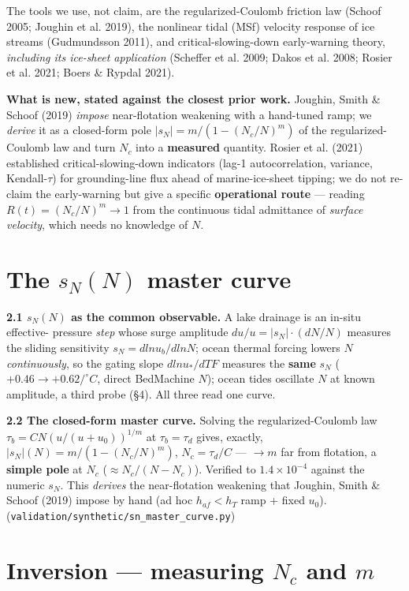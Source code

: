 \documentclass[tc, manuscript]{copernicus}
\begin{document}
The tools we use, not claim, are the regularized-Coulomb friction law (Schoof 2005; Joughin et al. 2019), the nonlinear tidal (MSf) velocity response of ice streams (Gudmundsson 2011), and critical-slowing-down early-warning theory, \emph{including its ice-sheet application} (Scheffer et al. 2009; Dakos et al. 2008; Rosier et al. 2021; Boers \& Rypdal 2021).

\textbf{What is new, stated against the closest prior work.} Joughin, Smith \& Schoof (2019) \emph{impose} near-flotation weakening with a hand-tuned ramp; we \emph{derive} it as a closed-form pole $|s_{N}|=m/(1-(N_{c}/N)^{m})$ of the regularized-Coulomb law and turn $N_{c}$ into a \textbf{measured} quantity. Rosier et al. (2021) established critical-slowing-down indicators (lag-1 autocorrelation, variance, Kendall-\ensuremath{\tau}) for grounding-line flux ahead of marine-ice-sheet tipping; we do not re-claim the early-warning but give a specific \textbf{operational route} — reading $R(t)=(N_{c}/N)^{m}\to 1$ from the continuous tidal admittance of \emph{surface velocity}, which needs no knowledge of $N$.

\section{The $s_{N}(N)$ master curve}

\textbf{2.1 $s_{N}(N)$ as the common observable.} A lake drainage is an in-situ effective- pressure \emph{step} whose surge amplitude $du/u=|s_{N}|\cdot (dN/N)$ measures the sliding sensitivity $s_{N}=d ln u_{b}/d ln N$; ocean thermal forcing lowers $N$ \emph{continuously}, so the gating slope $d ln u_*/dTF$ measures the \textbf{same} $s_{N}$ ($+0.46\to +0.62/^{\circ}C$, direct BedMachine $N$); ocean tides oscillate $N$ at known amplitude, a third probe (§4). All three read one curve.

\textbf{2.2 The closed-form master curve.} Solving the regularized-Coulomb law $\tau _{b}=C N (u/(u+u_{0}))^{1/m}$ at $\tau _{b}=\tau _{d}$ gives, exactly, $|s_{N}|(N)=m/(1-(N_{c}/N)^{m})$, $N_{c}=\tau _{d}/C$ — $\to m$ far from flotation, a \textbf{simple pole} at $N_{c}$ ($\approx N_{c}/(N-N_{c})$). Verified to $1.4\times 10^{-4}$ against the numeric $s_{N}$. This \emph{derives} the near-flotation weakening that Joughin, Smith \& Schoof (2019) impose by hand (ad hoc $h_{af}<h_{T}$ ramp + fixed $u_{0}$). (\texttt{validation/\allowbreak{}synthetic/\allowbreak{}sn\_\allowbreak{}master\_\allowbreak{}curve.\allowbreak{}py})

\section{Inversion — measuring $N_{c}$ and $m$}
\end{document}
